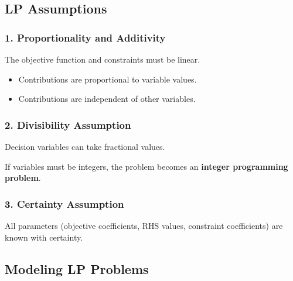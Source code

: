 \documentclass[12pt]{article}
\begin{document}

\subsection*{LP Assumptions}

\subsubsection*{1. Proportionality and Additivity}

The objective function and constraints must be linear.

\begin{itemize}
\item Contributions are proportional to variable values.
\item Contributions are independent of other variables.
\end{itemize}

\subsubsection*{2. Divisibility Assumption}

Decision variables can take fractional values.

If variables must be integers, the problem becomes an
\textbf{integer programming problem}.

\subsubsection*{3. Certainty Assumption}

All parameters (objective coefficients, RHS values, constraint coefficients)
are known with certainty.


\subsection{Modeling LP Problems}

\end{document}
